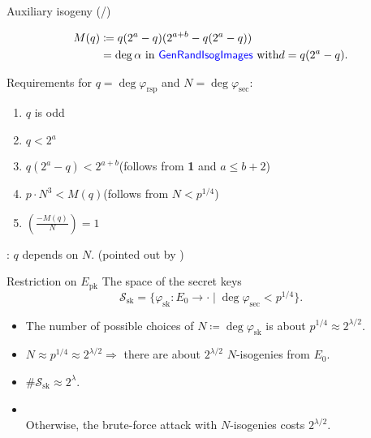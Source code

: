 \begin{frame}{Auxiliary isogeny (/\auxRIItotal{})}

    \vspace{-10pt}
    \begin{align*}
        M(q) &\coloneqq q(2^a - q)(2^{a + b} - q(2^a - q))\\
            &= \deg\alpha \text{ in \textcolor{blue}{\textsf{GenRandIsogImages}} with} d = q(2^a - q).
    \end{align*}

    \vspace{10pt}
    Requirements for $q = \deg\varphi_\mathrm{rsp}$ and $N = \deg\varphi_\mathrm{sec}$:
    \begin{enumerate}
        \item $q$ is odd
        \item $q < 2^a$
        \item $q(2^a - q) < 2^{a + b}$\quad (follows from \textbf{1} and $a \leq b + 2$)
        \item $p \cdot N^3 < M(q)$\qquad (follows from $N < p^{1/4}$)
        \item $\left(\frac{-M(q)}{N}\right) = 1$
    \end{enumerate}

    \vspace{10pt}
     : $q$ depends on $N$.\quad
    (pointed out by \cite{CCILV2024sqisign2d_attack})
\end{frame}

\begin{frame}{Restriction on $E_\mathrm{pk}$}
    The space of the secret keys
    $$
        \mathcal{S}_\mathrm{sk} = \{
            \varphi_\mathrm{sk}: E_0 \to \cdot
            \mid \deg\varphi_{\mathrm{sec}} < p^{1/4} \}.
    $$
    \begin{itemize}
        \setlength{\itemsep}{10pt}
        \item The number of possible choices of $N \coloneqq \deg\varphi_\mathrm{sk}$ is about $p^{1/4} \approx 2^{\lambda/2}$.
        \item $N \approx p^{1/4} \approx 2^{\lambda/2} \Rightarrow$ there are about $2^{\lambda/2}$ $N$-isogenies from $E_0$.
        \item $\#\mathcal{S}_\mathrm{sk} \approx 2^{\lambda}$.
        \item {}\\
            Otherwise, the brute-force attack with $N$-isogenies costs $2^{\lambda/2}$.
    \end{itemize}

\end{frame}


